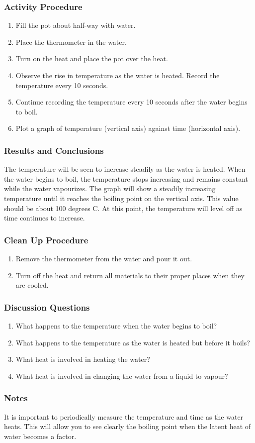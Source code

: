 \subsubsection*{Activity Procedure}
\begin{enumerate}
\item{Fill the pot about half-way with water.} 
\item{Place the thermometer in the water.} 
\item{Turn on the heat and place the pot over the heat.} 
\item{Observe the rise in temperature as the water is heated. Record the temperature every 10 seconds.} 
\item{Continue recording the temperature every 10 seconds after the water begins to boil.} 
\item{Plot a graph of temperature (vertical axis) against time (horizontal axis).} 
\end{enumerate}

\subsubsection*{Results and Conclusions}
The temperature will be seen to increase steadily as the water is heated. When the water begins to boil, the temperature stops increasing and remains constant while the water vapourizes. The graph will show a steadily increasing temperature until it reaches the boiling point on the vertical axis. This value should be about 100 degrees C. At this point, the temperature will level off as time continues to increase.  

\subsubsection*{Clean Up Procedure}
\begin{enumerate}
\item{Remove the thermometer from the water and pour it out.} 
\item{Turn off the heat and return all materials to their proper places when they are cooled.} 
\end{enumerate}

\subsubsection*{Discussion Questions}
\begin{enumerate}
\item{What happens to the temperature when the water begins to boil?}
\item{What happens to the temperature as the water is heated but before it boils?}
\item{What heat is involved in heating the water?}
\item{What heat is involved in changing the water from a liquid to vapour?}
\end{enumerate}

\subsubsection*{Notes}
It is important to periodically measure the temperature and time as the water heats.  This will allow you to see clearly the boiling point when the latent heat of water becomes a factor.
